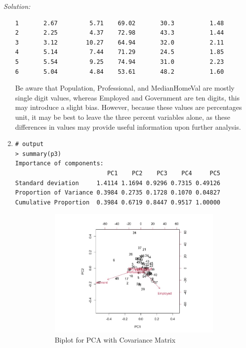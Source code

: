 \documentclass{article}
\newenvironment{solution}
    {\textit{Solution:}}
    {}
\begin{document}
\begin{solution}
\begin{enumerate}
\begin{lstlisting}
1       2.67         5.71    69.02       30.3          1.48
2       2.25         4.37    72.98       43.3          1.44
3       3.12        10.27    64.94       32.0          2.11
4       5.14         7.44    71.29       24.5          1.85
5       5.54         9.25    74.94       31.0          2.23
6       5.04         4.84    53.61       48.2          1.60
	\end{lstlisting}
Be aware that Population, Professional, and MedianHomeVal are mostly single digit values, whereas Employed and Government are ten digits, this may introduce a slight bias. However, because these values are percentages unit, it may be best to leave the three percent variables alone, as these differences in values may provide useful information upon further analysis.
\item\mbox{}
	\begin{lstlisting}
# output
> summary(p3)
Importance of components:
                          PC1    PC2    PC3    PC4     PC5
Standard deviation     1.4114 1.1694 0.9296 0.7315 0.49126
Proportion of Variance 0.3984 0.2735 0.1728 0.1070 0.04827
Cumulative Proportion  0.3984 0.6719 0.8447 0.9517 1.00000
	\end{lstlisting}
	\begin{figure}[h]\mbox{}
		\centering
		\begin{subfigure}{.4\textwidth}
  		\centering
  		\includegraphics[width=1\linewidth]{Rplot_figure1.jpeg}
  		\caption{Biplot for PCA with Covariance Matrix}
		\end{subfigure}%
		\begin{subfigure}{.4\textwidth}
  		\centering

\end{subfigure}
\end{figure}
\end{enumerate}
\end{solution}
\end{document}
